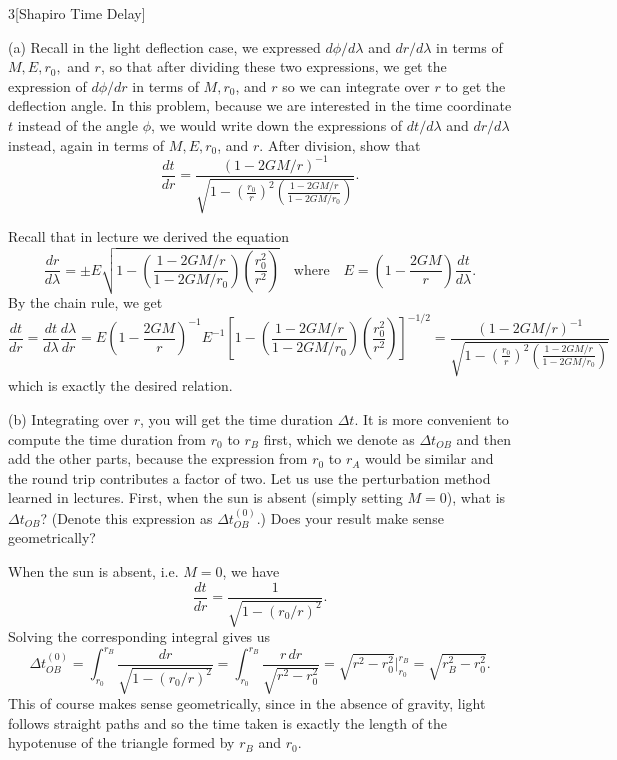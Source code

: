 \documentclass{../../templates/lkx_pset}
\begin{document}
\pagebreak
\begin{problem}{3}[Shapiro Time Delay]
\end{problem}

\begin{parts}
  \begin{part}{(a)}
    Recall in the light deflection case, we expressed $d\phi / d\lambda$ and $dr/d\lambda$ in terms of $M, E, r_0,$ and $r$, so that after dividing these two expressions, we get the expression of $d\phi / dr$ in terms of $M,r_0$, and $r$ so we can integrate over $r$ to get the deflection angle. In this problem, because we are interested in the time coordinate $t$ instead of the angle $\phi$, we would write down the expressions of $dt/d\lambda$ and $dr/d\lambda$ instead, again in terms of $M, E, r_0$, and $r$. After division, show that
  \[
    \frac{dt}{dr} = \frac{(1-2GM/r)^{-1}}{\sqrt{1-\left(\frac{r_0}{r}\right)^2\left(\frac{1-2GM/r}{1-2GM/r_0}\right)}}.
  \]
  \end{part}

  Recall that in lecture we derived the equation 
  \[
  \frac{dr}{d\lambda} = \pm E \sqrt{1-\left(\frac{1-2GM/r}{1-2GM/r_0}\right)\left(\frac{r_0^2}{r^2}\right)}
  \quad\textrm{where}\quad
  E = \left(1-\frac{2GM}{r}\right)\frac{dt}{d\lambda}.
  \]
  By the chain rule, we get
  \[
      \frac{dt}{dr} = \frac{dt}{d\lambda}\frac{d\lambda}{dr} = E\left(1-\frac{2GM}{r}\right)^{-1} E^{-1} \left[1-\left(\frac{1-2GM/r}{1-2GM/r_0}\right)\left(\frac{r_0^2}{r^2}\right)\right]^{-1/2} = \frac{(1-2GM/r)^{-1}}{\sqrt{1-\left(\frac{r_0}{r}\right)^2\left(\frac{1-2GM/r}{1-2GM/r_0}\right)}}
  \]
  which is exactly the desired relation.

  \begin{part}{(b)}
    Integrating over $r$, you will get the time duration $\Delta t$. It is more convenient to compute the time duration from $r_0$ to $r_B$ first, which we denote as $\Delta t_{OB}$ and then add the other parts, because the expression from $r_0$ to $r_A$ would be similar and the round trip contributes a factor of two. Let us use the perturbation method learned in lectures. First, when the sun is absent (simply setting $M=0$), what is $\Delta t_{OB}$? (Denote this expression as $\Delta t^{(0)}_{OB}$.) Does your result make sense geometrically?
  \end{part}

  When the sun is absent, i.e. $M=0$, we have
  \[
      \frac{dt}{dr} = \frac{1}{\sqrt{1-(r_0/r)^2}}.
  \]
  Solving the corresponding integral gives us
  \[
    \Delta t_{OB}^{(0)}=\int_{r_0}^{r_B} \frac{dr}{\sqrt{1-(r_0/r)^2}} = 
\int_{r_0}^{r_B} \frac{r\,dr}{\sqrt{r^2-r_0^2}} =
    {\sqrt{r^2 - r_0^2}}{\Big|}_{r_0}^{r_B} = \sqrt{r_B^2 - r_0^2}.
  \]
  This of course makes sense geometrically, since in the absence of gravity, light follows straight paths and so the time taken is exactly the length of the hypotenuse of the triangle formed by $r_B$ and $r_0$.


\end{parts}
\end{document}

